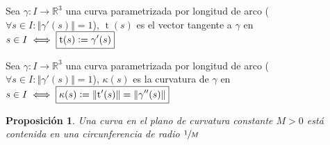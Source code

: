 \documentclass[12pt]{article}
\theoremstyle{plain}
\newtheorem{prop}{Proposición}[subsection]
\newcommand{\R}{\mathbb{R}}
\newcommand{\norm}[1]{\left\Vert#1\right\Vert}
\newcommand{\appl}[3]{#1 \colon #2 \longrightarrow #3}
\newcommand{\defeq}{\vcentcolon=}
\newcommand{\tngnt}{\operatorname{t}}
\renewcommand{\norm}[1]{\left\Vert#1\right\Vert}
\begin{document}
\begin{defn}
    Sea $\appl{\gamma}{I}{\R^3}$ una curva parametrizada por longitud de arco ($\forall s \in I : \norm{\gamma'(s)}=1$), $\tngnt(s)$ es el vector tangente a $\gamma$ en $s\in I \iff \boxed{\tngnt(s)\defeq \gamma'(s)}$
\end{defn}

\begin{defn}[Curvatura]
    Sea $\appl{\gamma}{I}{\R^3}$ una curva parametrizada por longitud de arco ($\forall s \in I : \norm{\gamma'(s)}=1$), $\kappa(s)$ es la curvatura de $\gamma$ en $s \in I \iff \boxed{\kappa(s) \defeq \norm{\tngnt'(s)}=\norm{\gamma''(s)}}$
\end{defn}

\begin{ejem}
    
\end{ejem}

\begin{prop}
    Una curva en el plano de curvatura constante $M > 0$ está contenida en una circunferencia de radio $\sfrac{1}{M}$
\end{prop}
\end{document}
